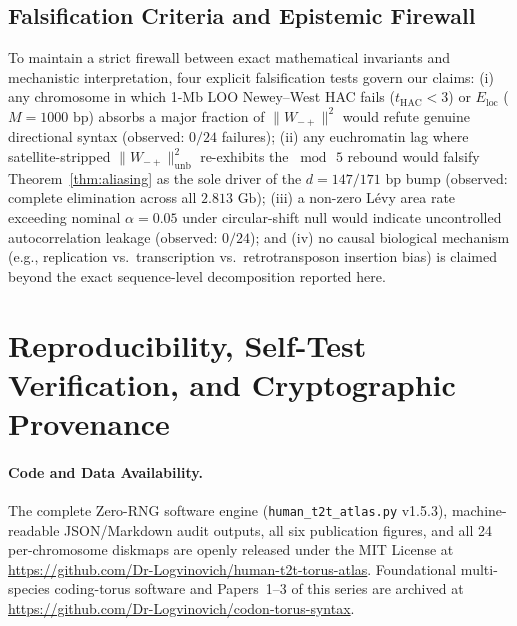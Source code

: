 \documentclass[11pt,a4paper]{article}
\newcommand{\Wmp}{W_{-+}}
\begin{document}
\subsection{Falsification Criteria and Epistemic Firewall}
To maintain a strict firewall between exact mathematical invariants and mechanistic interpretation, four explicit falsification tests govern our claims: (i) any chromosome in which 1-Mb LOO Newey--West HAC fails ($t_{\mathrm{HAC}} < 3$) or $E_{\mathrm{loc}}$ ($M=1000\text{ bp}$) absorbs a major fraction of $\|\Wmp\|^2$ would refute genuine directional syntax (observed: $0/24$ failures); (ii) any euchromatin lag where satellite-stripped $\|\Wmp\|^2_{\mathrm{unb}}$ re-exhibits the $\bmod\,5$ rebound would falsify Theorem~\ref{thm:aliasing} as the sole driver of the $d=147/171\text{ bp}$ bump (observed: complete elimination across all $2.813\text{ Gb}$); (iii) a non-zero L\'evy area rate exceeding nominal $\alpha=0.05$ under circular-shift null would indicate uncontrolled autocorrelation leakage (observed: $0/24$); and (iv) no causal biological mechanism (e.g., replication vs.\ transcription vs.\ retrotransposon insertion bias) is claimed beyond the exact sequence-level decomposition reported here.


\section{Reproducibility, Self-Test Verification, and Cryptographic Provenance}
\label{sec:repro}

\paragraph{Code and Data Availability.}
The complete Zero-RNG software engine (\texttt{human\_t2t\_atlas.py} v1.5.3), machine-readable JSON/Markdown audit outputs, all six publication figures, and all 24 per-chromosome diskmaps are openly released under the MIT License at \url{https://github.com/Dr-Logvinovich/human-t2t-torus-atlas}. Foundational multi-species coding-torus software and Papers~1--3 of this series are archived at \url{https://github.com/Dr-Logvinovich/codon-torus-syntax}.
\end{document}
